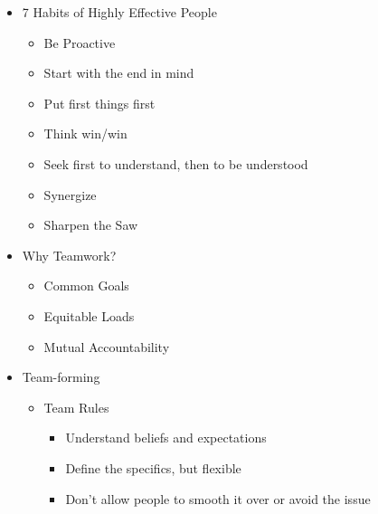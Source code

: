\begin{itemize}

  \item 7 Habits of Highly Effective People

    \begin{itemize}

      \item Be Proactive

      \item Start with the end in mind

      \item Put first things first

      \item Think win/win

      \item Seek first to understand, then to be understood

      \item Synergize

      \item Sharpen the Saw

    \end{itemize}

  \item Why Teamwork?

    \begin{itemize}

      \item Common Goals

      \item Equitable Loads

      \item Mutual Accountability

    \end{itemize}

  \item Team-forming

    \begin{itemize}

      \item Team Rules

        \begin{itemize}

          \item Understand beliefs and expectations

          \item Define the specifics, but flexible

          \item Don't allow people to smooth it over or avoid the issue


\end{itemize}
\end{itemize}
\end{itemize}
